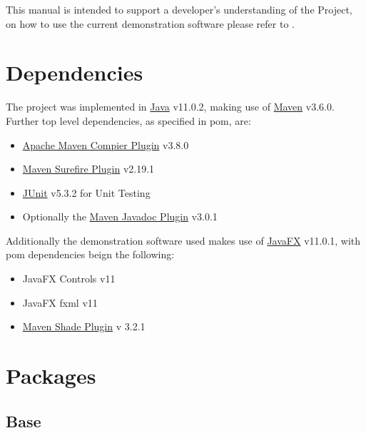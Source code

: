 \documentclass[main.tex]{subfiles}
\begin{document}
  
  This manual is intended to support a developer's understanding of the Project, on how to use the current demonstration software please refer to .
  
  \section{Dependencies}
  
    The project was implemented in \href{https://openjdk.java.net/projects/jdk/11/}{Java} v11.0.2, making use of \href{http://maven.apache.org/}{Maven} v3.6.0. Further top level dependencies, as specified in pom, are:
    \begin{itemize}
      \item \href{https://maven.apache.org/plugins/maven-compiler-plugin/index.html}{Apache Maven Compier Plugin} v3.8.0
      \item \href{https://maven.apache.org/surefire/maven-surefire-plugin/}{Maven Surefire Plugin} v2.19.1
      \item \href{https://junit.org/junit5/}{JUnit} v5.3.2 for Unit Testing
      \item Optionally the \href{https://maven.apache.org/plugins/maven-javadoc-plugin/}{Maven Javadoc Plugin} v3.0.1
    \end{itemize}
    Additionally the demonstration software used makes use of \href{https://openjfx.io/}{JavaFX} v11.0.1, with pom dependencies beign the following:
    \begin{itemize}
      \item JavaFX Controls v11
      \item JavaFX fxml v11
      \item \href{https://maven.apache.org/plugins/maven-shade-plugin/}{Maven Shade Plugin} v 3.2.1
    \end{itemize}
  
  \section{Packages}
    
    \subsection{Base}
    
\end{document}
